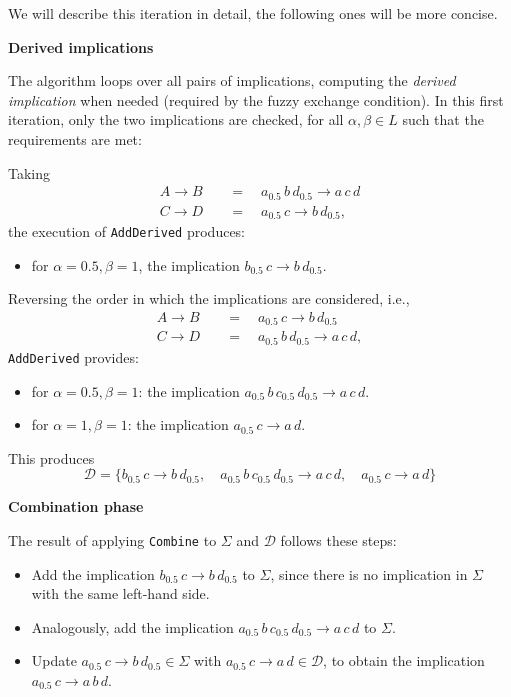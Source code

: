 \documentclass[
  letterpaper,
  DIV=11,
  numbers=noendperiod]{scrartcl}
\providecommand{\tightlist}{%
  \setlength{\itemsep}{0pt}\setlength{\parskip}{0pt}}\usepackage{longtable,booktabs,array}
\begin{document}
We will describe this iteration in detail, the following ones will be
more concise.

\textbf{Derived implications}

The algorithm loops over all pairs of implications, computing the
\emph{derived implication} when needed (required by the fuzzy exchange
condition). In this first iteration, only the two implications are
checked, for all \(\alpha,\beta\in L\) such that the requirements are
met:

Taking \begin{align*}
A\to B \quad& = \quad a_{0.5}\,b\,d_{0.5} \to a\,c\,d \\
C\to D \quad& = \quad a_{0.5}\,c \to b\,d_{0.5},
\end{align*} the execution of \texttt{AddDerived} produces:

\begin{itemize}
\tightlist
\item
  for \(\alpha=0.5, \beta=1\), the implication
  \(b_{0.5}\,c \to b\,d_{0.5}\).
\end{itemize}

Reversing the order in which the implications are considered, i.e.,
\begin{align*}
A\to B \quad& =  \quad a_{0.5}\,c \to b\,d_{0.5} \\
C\to D \quad& = \quad a_{0.5}\,b\,d_{0.5} \to a\,c\,d,
\end{align*} \texttt{AddDerived} provides:

\begin{itemize}
\tightlist
\item
  for \(\alpha=0.5, \beta=1\): the implication
  \(a_{0.5}\,b\,c_{0.5}\,d_{0.5} \to a\,c\,d\).
\item
  for \(\alpha=1, \beta=1\): the implication \(a_{0.5}\,c \to a\,d\).
\end{itemize}

This produces
\[\mathcal D = \{b_{0.5}\,c \to b\,d_{0.5},\quad a_{0.5}\,b\,c_{0.5}\,d_{0.5} \to a\,c\,d,\quad a_{0.5}\,c \to a\,d\}\]

\textbf{Combination phase}

The result of applying \texttt{Combine} to \(\Sigma\) and \(\mathcal D\)
follows these steps:

\begin{itemize}
\tightlist
\item
  Add the implication \(b_{0.5}\,c \to b\,d_{0.5}\) to \(\Sigma\), since
  there is no implication in \(\Sigma\) with the same left-hand side.
\item
  Analogously, add the implication
  \(a_{0.5}\,b\,c_{0.5}\,d_{0.5} \to a\,c\,d\) to \(\Sigma\).
\item
  Update \(a_{0.5}\,c \to b\,d_{0.5} \in \Sigma\) with
  \(a_{0.5}\,c \to a\,d\in\mathcal D\), to obtain the implication
  \(a_{0.5}\,c \to a\,b\,d\).
\end{itemize}
\end{document}
